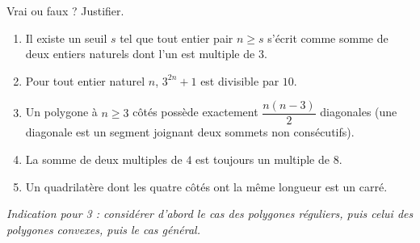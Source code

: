 Vrai ou faux ? Justifier.
\begin{enumerate}
  \item \og Il existe un seuil $s$ tel que tout entier pair $n \geqslant s$ s'écrit
  comme somme de deux entiers naturels dont l'un est multiple de $3$. \fg
  \item \og Pour tout entier naturel $n$, $3^{2n} + 1$ est divisible par $10$. \fg
  \item \og Un polygone à $n \geqslant 3$ côtés possède exactement
  $\dfrac{n(n-3)}{2}$ diagonales \fg{} (une diagonale est un segment joignant
  deux sommets non consécutifs).
  \item \og La somme de deux multiples de $4$ est toujours un multiple de $8$. \fg
  \item \og Un quadrilatère dont les quatre côtés ont la même longueur est un
  carré. \fg
\end{enumerate}
\emph{Indication pour 3 : considérer d'abord le cas des polygones réguliers,
puis celui des polygones convexes, puis le cas général.}
